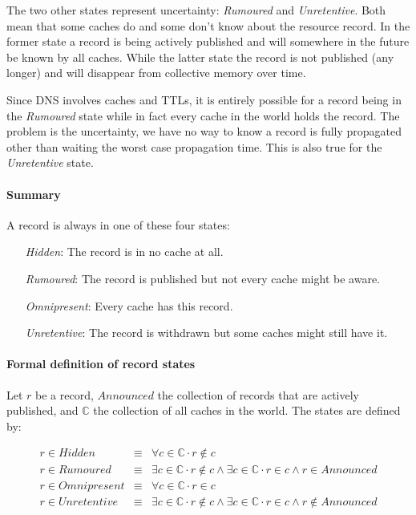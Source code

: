 \documentclass[twoside, a4paper]{article}
\begin{document}
The two other states represent uncertainty: \emph{Rumoured} and \emph
{Unretentive}. Both mean that some caches do and some don't know 
about the resource record. In the former state a record is being 
actively published and will somewhere in the future be known by all 
caches. While the latter state the record is not published (any 
longer) and will disappear from collective memory over time.

Since DNS involves caches and TTLs, it is entirely possible for a 
record being in the \emph{Rumoured} state while in fact every cache 
in the world holds the record. The problem is the uncertainty, we 
have no way to know a record is fully propagated other than waiting 
the worst case propagation time. This is also true for the \emph
{Unretentive} state.

\paragraph{Summary} A record is always in one of these four states:

\begin{itemize}
\item[\emph{Hidden}:] 		
			The record is in no cache at all.
\item[\emph{Rumoured}:] 		
			The record is published but not every cache might be aware.
\item[\emph{Omnipresent}:]
			Every cache has this record.
\item[\emph{Unretentive}:]
			The record is withdrawn but some caches might still have it.
\end{itemize} 

\paragraph{Formal definition of record states} Let $r$ be a record, 
$Announced$ the collection of records that are actively published, 
and $\mathbb{C}$ the collection of all caches in the world. The 
states are defined by:

\begin{displaymath}
\begin{array}{lllll}
       r\in Hidden      & \equiv & \forall c \in \mathbb{C} \cdot r \not \in c \\
       r\in Rumoured    & \equiv & \exists c \in \mathbb{C} \cdot r \not \in c \wedge \exists c \in \mathbb{C} \cdot r\in c \wedge r\in Announced\\
       r\in Omnipresent & \equiv & \forall c \in \mathbb{C} \cdot r \in c \\
       r\in Unretentive & \equiv & \exists c \in \mathbb{C} \cdot r \not \in c \wedge \exists c \in \mathbb{C} \cdot r \in c \wedge r \notin Announced \\
\end{array}
\end{displaymath}
\end{document}
